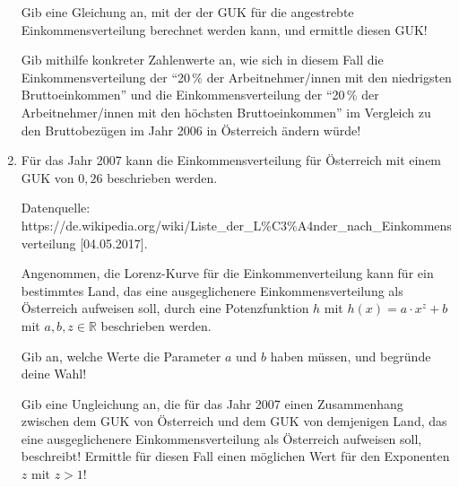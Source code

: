 \begin{langesbeispiel}
\begin{enumerate}
	Gib eine Gleichung an, mit der der GUK für die angestrebte Einkommensverteilung berechnet werden kann, und ermittle diesen GUK!\leer
	
	Gib mithilfe konkreter Zahlenwerte an, wie sich in diesem Fall die Einkommensverteilung der "`20\,\% der Arbeitnehmer/innen mit den niedrigsten Bruttoeinkommen"' und die Einkommensverteilung der "`20\,\% der Arbeitnehmer/innen mit den höchsten Bruttoeinkommen"' im Vergleich zu den Bruttobezügen im Jahr 2006 in Österreich ändern würde!\leer
	
	\item Für das Jahr 2007 kann die Einkommensverteilung für Österreich mit einem GUK von $0,26$ beschrieben werden.
	
	\begin{scriptsize}\begin{singlespace}Datenquelle: https://de.wikipedia.org/wiki/Liste\_der\_L\%C3\%A4nder\_nach\_Einkommensverteilung [04.05.2017]. \end{singlespace}\end{scriptsize}\leer
	
	Angenommen, die Lorenz-Kurve für die Einkommenverteilung kann für ein bestimmtes Land, das eine ausgeglichenere Einkommensverteilung als Österreich aufweisen soll, durch eine Potenzfunktion $h$ mit $h(x)=a\cdot x^z+b$ mit $a,b,z\in\mathbb{R}$ beschrieben werden.\leer
	
	Gib an, welche Werte die Parameter $a$ und $b$ haben müssen, und begründe deine Wahl!\leer
	
	Gib eine Ungleichung an, die für das Jahr 2007 einen Zusammenhang zwischen dem GUK von Österreich und dem GUK von demjenigen Land, das eine ausgeglichenere Einkommensverteilung als Österreich aufweisen soll, beschreibt! Ermittle für diesen Fall einen möglichen Wert für den Exponenten $z$ mit $z>1$!
	
\end{enumerate}

\end{langesbeispiel}
